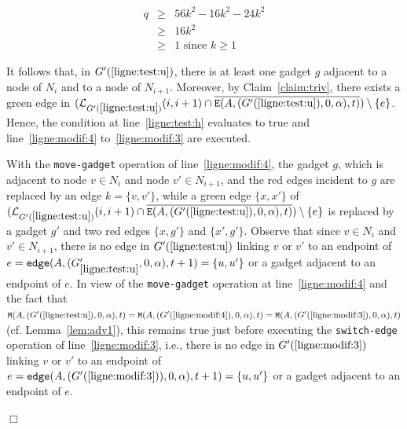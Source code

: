 \documentclass[11pt]{article}
\newcommand{\qed}{\hfill $\Box$ \bigbreak}
\newenvironment{proof}{\noindent {\bf Proof.}}{\qed}
\begin{document}
{\begin{proof}
\begin{eqnarray*}
  q & \geq & 56k^2 - 16k^2 - 24k^2\\
  & \geq & 16k^2\\
  & \geq & 1 \mbox{ since $k\geq 1$}
\end{eqnarray*}

It follows that, in $G'(\ref{ligne:test:u})$, there is at least one gadget $g$ adjacent to a node of $N_i$ and to a node of $N_{i+1}$. Moreover, by Claim~\ref{claim:triv}, there exists a green edge in $(\mathcal{L}_{G'(\ref{ligne:test:u})}(i,i+1)\cap\overline{{\tt E}(A,(G'(\ref{ligne:test:u}),0,\alpha),t)})\setminus \{e\}$. Hence, the condition at line~\ref{ligne:test:h} evaluates to true and line~\ref{ligne:modif:4} to~\ref{ligne:modif:3} are executed. 

With the {\tt move\mbox{-}gadget} operation of line~\ref{ligne:modif:4}, the gadget $g$, which is adjacent to node $v\in N_i$ and node $v'\in N_{i+1}$, and the red edges incident to $g$ are replaced by an edge $k=\{v,v'\}$, while a green edge $\{x,x'\}$ of $(\mathcal{L}_{G'(\ref{ligne:test:u})}(i,i+1)\cap\overline{{\tt E}(A,(G'(\ref{ligne:test:u}),0,\alpha),t)})\setminus \{e\}$ is replaced by a gadget $g'$ and two red edges $\{x,g'\}$ and $\{x',g'\}$. Observe that since $v\in N_i$ and $v'\in N_{i+1}$, there is no edge in $G'(\ref{ligne:test:u})$ linking $v$ or $v'$ to an endpoint of $e={\tt edge}(A,(G'_{\ref{ligne:test:u}},0,\alpha),t+1)=\{u,u'\}$ or a gadget adjacent to an endpoint of $e$. In view of the {\tt move\mbox{-}gadget} operation at line~\ref{ligne:modif:4} and the fact that ${\tt M}(A,(G'({\ref{ligne:test:u}}),0,\alpha),t)={\tt M}(A,(G'({\ref{ligne:modif:4}}),0,\alpha),t)={\tt M}(A,(G'({\ref{ligne:modif:3}}),0,\alpha),t)$ (cf. Lemma~\ref{lem:adv1}), this remains true just before executing the {\tt switch\mbox{-}edge} operation of line~\ref{ligne:modif:3}, i.e., there is no edge in $G'(\ref{ligne:modif:3})$ linking $v$ or $v'$ to an endpoint of $e={\tt edge}(A,(G'(\ref{ligne:modif:3})),0,\alpha),t+1)=\{u,u'\}$ or a gadget adjacent to an endpoint of $e$. 


\end{proof}}
\end{document}
